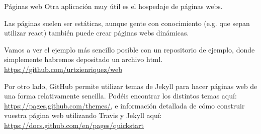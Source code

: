 \documentclass{beamer}
\begin{document}
\begin{frame}{Páginas web}
    Otra aplicación muy útil es el hospedaje de páginas webs.

    Las páginas suelen ser estáticas, aunque gente con conocimiento 
    (e.g. que sepan utilizar react) también puede crear 
    páginas webs dinámicas.\newline

    Vamos a ver el ejemplo más sencillo posible con un repositorio de ejemplo, 
    donde simplemente habremos depositado un archivo html. \href{https://github.com/urtzienriquez/web}{https://github.com/urtzienriquez/web}\newline

    Por otro lado, GitHub permite utilizar temas de Jekyll para hacer 
    páginas web de una forma relativamente sencilla. Podéis encontrar 
    los distintos temas aquí: \href{https://pages.github.com/themes/}{https://pages.github.com/themes/},
    e información detallada de cómo construir vuestra página web
    utilizando Travis y Jekyll aquí: \href{https://docs.github.com/en/pages/quickstart}{https://docs.github.com/en/pages/quickstart}
\end{frame}
\end{document}
